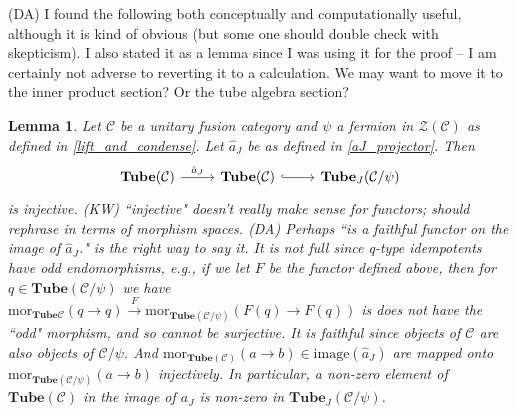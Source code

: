 \documentclass[12pt,a4paper]{article}
\newtheorem{lemma}[theorem]{Lemma}
\newcounter{arrow}
\newcommand{\ra}{\rightarrow}
\newcommand{\mcz}{\mathcal{Z}}
\newcommand{\mcc}{\mathcal{C}}
\newcommand{\tube}{\textbf{Tube}}
\newcommand{\kw}[1]{{\color{kwcolor}\footnotesize{(KW) #1}}}
\newcommand{\dave}[1]{{\color{ao(english)}\footnotesize{(DA) #1}}}
\begin{document}
\dave{I found the following both conceptually and computationally useful, although it is kind of obvious (but some one should double check with skepticism).
I also stated it as a lemma since I was using it for the proof -- I am certainly not adverse to reverting it to a calculation.
We may want to move it to the inner product section?
Or the tube algebra section?}
\begin{lemma}
\label{image_aJ}
Let $\mcc$ be a unitary fusion category and $\psi$ a fermion in $\mcz(\mcc)$ as defined in \ref{lift_and_condense}.
Let $\hat{a}_J$ be as defined in \eqref{aJ_projector}.
Then 
\[\begin{tikzcd}        
    \tube(\mcc)\arrow{r}{\hat{a}_J} &\tube(\mcc) \arrow[hook]{r} &  \tube_J(\mcc/\psi)
\end{tikzcd}\]
is injective.
\kw{``injective" doesn't really make sense for functors; should rephrase in terms of morphism spaces.}
\dave{Perhaps ``is a faithful functor on the image of $\hat{a}_J$." is the right way to say it. 
It is not full since q-type idempotents have odd endomorphisms, 
e.g., if we let $F$ be the functor defined above, 
then for $q \in \tube(\mcc/\psi)$ we have $\text{mor}_{\tube{\mcc}}(q\ra q) \xrightarrow{F} \text{mor}_{\tube(\mcc/\psi)}(F(q) \ra F(q))$ is does not have the ``odd" morphism, and so cannot be surjective.
It is faithful since objects of $\mcc$ are also objects of $\mcc/\psi$.
And $\text{mor}_{\tube(\mcc)}(a \ra b) \in \text{image}(\hat{a}_J)$ are mapped onto $\text{mor}_{\tube(\mcc/\psi)}(a \ra b)$ injectively.}
In particular, a non-zero element of $\tube(\mcc)$ in the image of $a_J$ is non-zero in $\tube_J(\mcc/\psi)$.
\end{lemma}
\end{document}
